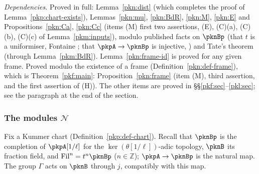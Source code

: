 \documentclass[10pt]{amsart}
\theoremstyle{definition}
\theoremstyle{remark}
\newcommand{\Z}{\mathbb Z}
\begin{document}
\emph{Dependencies.} Proved in full: Lemma~\ref{pkn:dist} (which completes the proof of
Lemma~\ref{pkp:chart-exists}), Lemmas~\ref{pkn:mu}, \ref{pkn:BdR}, \ref{pkn:M}, \ref{pkn:E} and
Propositions~\ref{pkn:Ca}, \ref{pkn:Cc} (items (M) first two assertions, (E), (C)(a), (C)(b), (C)(c) of
Lemma~\ref{pkm:inputs}), modulo published facts on $\pknBp$ (that $t$ is a uniformiser,
Fontaine \cite[1.5.2, 1.5.4]{pkfFontaineII}; that $\pkpA\to\pknBp$ is injective, \cite[4.1.1]{pkfFontaineII}) and Tate's theorem (through Lemma~\ref{pkm:BdR}). Lemma~\ref{pkn:frame-id} is proved for any given frame. Proved modulo the existence of a frame (Definition~\ref{pkn:def-frame}), which is
Theorem~\ref{pkf:main}: Proposition~\ref{pkn:frame} (item (M), third assertion, and the first assertion
of (H)). The other items are proved in \S\S\ref{pkf:sec}--\ref{pkl:sec}; see the paragraph at the end
of the section.

\subsubsection{The modules $\mathcal N$}\label{pkn:ss-def}

Fix a Kummer chart (Definition~\ref{pkp:def-chart}). Recall that $\pknBp$ is the completion of
$\pkpA[1/\ell]$ for the $\ker(\theta[1/\ell])$-adic topology, $\pknB$ its fraction field, and
$\mathrm{Fil}^n=t^n\pknBp$ ($n\in\Z$); $\pkpA\to\pknBp$ is the natural map. The group $\Gamma$ acts on
$\pknB$ through $j$, compatibly with this map.
\end{document}
